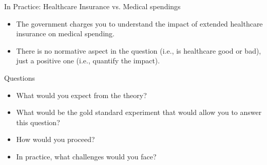 \documentclass[notes,10pt, aspectratio=169]{beamer}
\begin{document}
\begin{frame}{In Practice: Healthcare Insurance vs. Medical spendings}
\begin{itemize}
    \item The government charges you to understand the impact of extended healthcare insurance on medical spending.
    \item There is no normative aspect in the question (i.e., is healthcare good or bad), just a positive one (i.e., quantify the impact).
\end{itemize}

    \begin{exampleblock}{Questions}
    \begin{itemize}
        \item What would you expect from the theory?
        \item What would be the gold standard experiment that would allow you to answer this question?
        \item How would you proceed?
        \item In practice, what challenges would you face?
    \end{itemize}
    \end{exampleblock}
\end{frame}
\end{document}
